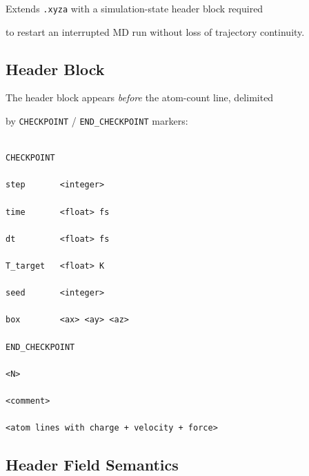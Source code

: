\documentclass[12pt, a4paper, oneside]{article}
\begin{document}
\label{sec:xyzc}



Extends \texttt{.xyza} with a simulation-state header block required

to restart an interrupted MD run without loss of trajectory continuity.


\subsection{Header Block}


The header block appears \emph{before} the atom-count line, delimited

by \texttt{CHECKPOINT} / \texttt{END\_CHECKPOINT} markers:


\begin{lstlisting}[language={},frame=single]

CHECKPOINT

step       <integer>

time       <float> fs

dt         <float> fs

T_target   <float> K

seed       <integer>

box        <ax> <ay> <az>

END_CHECKPOINT

<N>

<comment>

<atom lines with charge + velocity + force>

\end{lstlisting}


\subsection{Header Field Semantics}
\end{document}
